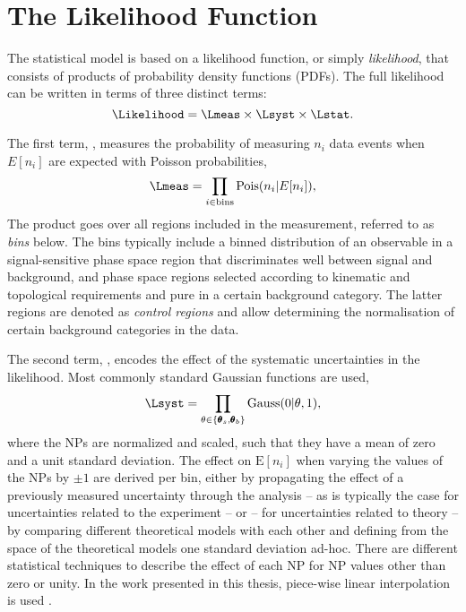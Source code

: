 
\section{The Likelihood Function}
\label{sec:likelihood}
The statistical model is based on a likelihood function, or simply \emph{likelihood}, that consists of products of probability density functions (PDFs). The full likelihood can be written in terms of three distinct terms:
\begin{equation}
    \Likelihood = \Lmeas \times \Lsyst \times \Lstat.
\end{equation}

The first term, \Lmeas, measures the probability of measuring $n_i$ data events when $E[n_i]$ are expected with Poisson probabilities, 
\begin{equation}
    \Lmeas = \prod_{i \in \text{bins}} \text{Pois}(n_i | E[n_i] ),
\end{equation}
The product goes over all regions included in the measurement, referred to as \emph{bins} below. The bins typically include a binned distribution of an observable in a signal-sensitive phase space region that discriminates well between signal and background, and phase space regions selected according to kinematic and topological requirements and pure in a certain background category. The latter regions are denoted as \emph{control regions} and allow determining the normalisation of certain background categories in the data.

The second term, \Lsyst, encodes the effect of the systematic uncertainties in the likelihood. Most commonly standard Gaussian functions are used,
\begin{equation}
    \Lsyst = \prod_{\theta \in \{ \pmb{\theta}_s,\pmb{\theta}_b \}} \text{Gauss}(0 | \theta, 1),
\end{equation}
where the NPs are normalized and scaled, such that they have a mean of zero and a unit standard deviation. 
The effect on $\text{E}[n_i]$ when varying the values of the NPs by $\pm 1$ are derived per bin, either by propagating the effect of a previously measured uncertainty through the analysis -- as is typically the case for uncertainties related to the experiment -- or -- for uncertainties related to theory -- by comparing different theoretical models with each other and defining from the space of the theoretical models one standard deviation ad-hoc.
There are different statistical techniques to describe the effect of each NP for NP values other than zero or unity.
In the work presented in this thesis, piece-wise linear interpolation is used .



